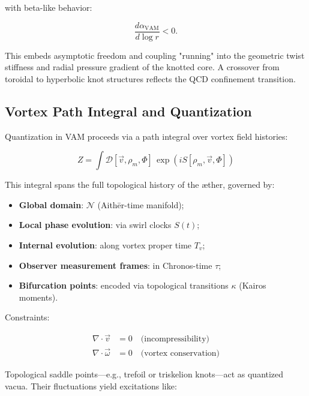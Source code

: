 \documentclass[12pt]{article}
\begin{document}
with beta-like behavior:

\begin{equation}
\frac{d \alpha_{\text{VAM}}}{d \log r} < 0.
\end{equation}

This embeds asymptotic freedom and coupling "running" into the geometric twist stiffness and radial pressure gradient of the knotted core. A crossover from toroidal to hyperbolic knot structures reflects the QCD confinement transition.

\subsection{Vortex Path Integral and Quantization}

Quantization in VAM proceeds via a path integral over vortex field histories:

\begin{equation}
Z = \int \mathcal{D}[\vec{v}, \rho_{\scriptscriptstyle\boldsymbol\!m}, \Phi] \, \exp\left( i S[\rho_{\scriptscriptstyle\boldsymbol\!m}, \vec{v}, \Phi] \right)
\end{equation}

This integral spans the full topological history of the æther, governed by:

\begin{itemize}
    \item \textbf{Global domain}: \( \mathcal{N} \) (Aithēr-time manifold);
    \item \textbf{Local phase evolution}: via swirl clocks \( S(t) \);
    \item \textbf{Internal evolution}: along vortex proper time \( T_v \);
    \item \textbf{Observer measurement frames}: in Chronos-time \( \tau \);
    \item \textbf{Bifurcation points}: encoded via topological transitions \( \kappa \) (Kairos moments).
\end{itemize}

Constraints:

\begin{align}
\nabla \cdot \vec{v} &= 0 \quad \text{(incompressibility)} \\
\nabla \cdot \vec{\omega} &= 0 \quad \text{(vortex conservation)}
\end{align}

Topological saddle points—e.g., trefoil or triskelion knots—act as quantized vacua. Their fluctuations yield excitations like:
\end{document}
